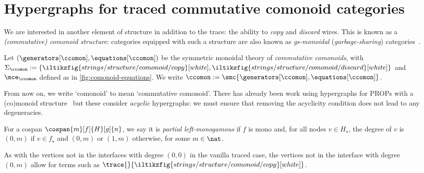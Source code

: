 \section{Hypergraphs for traced commutative comonoid categories}

We are interested in another element of structure in addition to the trace: the
ability to \emph{copy} and \emph{discard} wires.
This is known as a \emph{(commutative) comonoid structure}: categories equipped
with such a structure are also known as \emph{gs-monoidal}
(\emph{garbage-sharing}) categories~\cite{fritz2022free}.

\begin{definition}
    Let \((\generators[\ccomon], \equations[\ccomon])\) be the symmetric
    monoidal theory of \emph{commutative comonoids}, with \(\Sigma_\ccomon := \{
        \iltikzfig{strings/structure/comonoid/copy}[white],
        \iltikzfig{strings/structure/comonoid/discard}[white]
    \}\) and \(\mce_\ccomon\) defined as in \cref{fig:comonoid-equations}.
    We write \(\ccomon := \smc{\generators[\ccomon], \equations[\ccomon]}\).
\end{definition}

From now on, we write `comonoid' to mean `commutative comonoid'.
There has already been work using hypergraphs for PROPs with a (co)monoid
structure~\cite{fritz2022free,milosavljevic2022string} but these consider
\emph{acyclic} hypergraphs: we must ensure that removing the acyclicity
condition does not lead to any degeneracies.

\begin{definition}
    For a cospan \(\cospan{m}[f]{H}[g]{n}\), we say it is
    \emph{partial left-monogamous} if \(f\) is mono and, for all nodes
    \(v \in H_\star\), the degree of \(v\) is \((0,m)\) if \(v \in f_\star\) and
    \((0,m)\) or \((1,m)\) otherwise, for some \(m \in \nat\).
\end{definition}

\begin{remark}
    As with the vertices not in the interfaces with degree \((0, 0)\) in the
    vanilla traced case, the vertices not in the interface with degree
    \((0, m)\) allow for terms such as \(
        \trace{}{\iltikzfig{strings/structure/comonoid/copy}[white]}
    \).
\end{remark}

